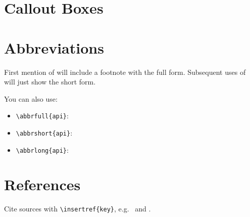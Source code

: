\section{Callout Boxes}
\label{sec:callouts}





\section{Abbreviations}
\label{sec:abbreviations}

First mention of  will include a footnote with the full form.
Subsequent uses of  will just show the short form.

You can also use:
\begin{itemize}[leftmargin=2em]
  \item \verb|\abbrfull{api}|: 
  \item \verb|\abbrshort{api}|: 
  \item \verb|\abbrlong{api}|: 
\end{itemize}


\section{References}
\label{sec:references}

Cite sources with \verb|\insertref{key}|, e.g.\
 and .
